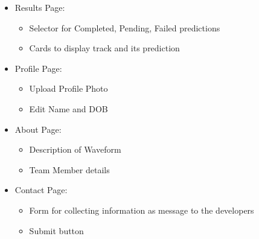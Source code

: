 \documentclass[11pt]{report}
\begin{document}
\begin{itemize}
    \item Results Page:
    \begin{itemize}[label=--]
        \item Selector for Completed, Pending, Failed predictions
        \item Cards to display track and its prediction
    \end{itemize}

    \item Profile Page:
    \begin{itemize}[label=--]
        \item Upload Profile Photo
        \item Edit Name and DOB
    \end{itemize}
    
    \item About Page:
    \begin{itemize}[label=--]
        \item Description of Waveform
        \item Team Member details
    \end{itemize}
    
    \item Contact Page:
    \begin{itemize}[label=--]
        \item Form for collecting information as message to the developers
        \item Submit button
    \end{itemize}
\end{itemize}
\end{document}
